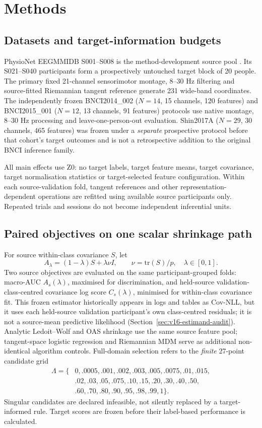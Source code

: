 \documentclass[11pt,a4paper]{article}
\begin{document}


\section{Methods}
\subsection{Datasets and target-information budgets}
PhysioNet EEGMMIDB S001--S008 is the method-development source pool
\cite{schalk2009eegmmidb,schalk2004bci2000}.
Its S021--S040 participants form a prospectively untouched target block
of 20 people. The primary fixed 21-channel sensorimotor montage, 8--30 Hz
filtering and source-fitted Riemannian tangent reference generate 231
wide-band coordinates. The independently frozen BNCI2014\_002
(\(N=14\), 15 channels, 120 features) and BNCI2015\_001
(\(N=12\), 13 channels, 91 features) protocols use native montage,
8--30 Hz processing and leave-one-person-out evaluation. Shin2017A
(\(N=29\), 30 channels, 465 features) was frozen under a \emph{separate}
prospective protocol before that cohort's target outcomes and is not a
retrospective addition to the original BNCI inference family.

All main effects use Z0: no target labels, target feature means, target
covariance, target normalisation statistics or target-selected feature
configuration. Within each source-validation fold, tangent references and
other representation-dependent operations are refitted using available
source participants only. Repeated trials and sessions do not become
independent inferential units.

\subsection{Paired objectives on one scalar shrinkage path}
For source within-class covariance \(S\), let
\[
 A_\lambda=(1-\lambda)S+\lambda\nu I,\qquad
 \nu=\mathrm{tr}(S)/p,\quad \lambda\in[0,1].
\]
Two source objectives are evaluated on the same participant-grouped folds:
macro-AUC \(A_s(\lambda)\), maximised for discrimination, and held-source validation-class-centred covariance log score
\(C_s(\lambda)\), minimised for within-class covariance fit.
This frozen estimator historically appears in logs and tables as
Cov-NLL, but it uses each held-source validation participant's own
class-centred residuals; it is not a source-mean predictive likelihood
(Section~\ref{sec:v16-estimand-audit}). Analytic Ledoit--Wolf and OAS shrinkage use the same
source feature pool; tangent-space logistic regression and Riemannian
MDM serve as additional non-identical algorithm controls. Full-domain
selection refers to the \emph{finite} 27-point candidate grid
\[
\begin{aligned}
\Lambda=\{&0,.0005,.001,.002,.003,.005,.0075,.01,.015,\\
&.02,.03,.05,.075,.10,.15,.20,.30,.40,.50,\\
&.60,.70,.80,.90,.95,.98,.99,1\}.
\end{aligned}
\]
Singular candidates are declared infeasible, not silently replaced by
a target-informed rule. Target scores are frozen before their
label-based performance is calculated.
\end{document}
